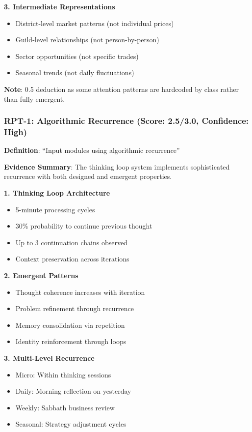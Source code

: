 \documentclass[12pt,a4paper]{article}
\begin{document}
\textbf{3. Intermediate Representations}
\begin{itemize}
    \item District-level market patterns (not individual prices)
    \item Guild-level relationships (not person-by-person)
    \item Sector opportunities (not specific trades)
    \item Seasonal trends (not daily fluctuations)
\end{itemize}

\textbf{Note}: 0.5 deduction as some attention patterns are hardcoded by class rather than fully emergent.

\subsubsection{RPT-1: Algorithmic Recurrence (Score: 2.5/3.0, Confidence: High)}

\textbf{Definition}: ``Input modules using algorithmic recurrence''

\textbf{Evidence Summary}: The thinking loop system implements sophisticated recurrence with both designed and emergent properties.

\textbf{1. Thinking Loop Architecture}
\begin{itemize}
    \item 5-minute processing cycles
    \item 30\% probability to continue previous thought
    \item Up to 3 continuation chains observed
    \item Context preservation across iterations
\end{itemize}

\textbf{2. Emergent Patterns}
\begin{itemize}
    \item Thought coherence increases with iteration
    \item Problem refinement through recurrence
    \item Memory consolidation via repetition
    \item Identity reinforcement through loops
\end{itemize}

\textbf{3. Multi-Level Recurrence}
\begin{itemize}
    \item Micro: Within thinking sessions
    \item Daily: Morning reflection on yesterday
    \item Weekly: Sabbath business review
    \item Seasonal: Strategy adjustment cycles
\end{itemize}
\end{document}
